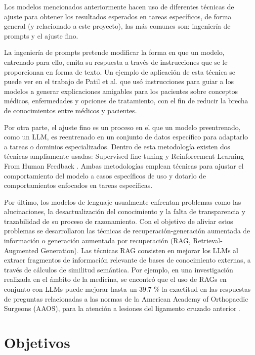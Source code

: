 Los modelos mencionados anteriormente hacen uso de diferentes técnicas de ajuste
para obtener los resultados esperados en tareas específicos, de forma general
(y relacionado a este proyecto), las más comunes son: ingeniería de
prompts y el ajuste fino.

La ingeniería de prompts pretende modificar la forma en que un modelo, entrenado
para ello, emita su respuesta a través de instrucciones que se le proporcionan
en forma de texto. Un ejemplo de aplicación de esta técnica se puede ver en el
trabajo de Patil et al. \cite{patil_prompt_2024} que usó instrucciones para
guiar a los modelos a generar explicaciones amigables para los pacientes sobre
conceptos médicos, enfermedades y opciones de tratamiento, con el fin de
reducir la brecha de conocimientos entre médicos y pacientes.

Por otra parte, el ajuste fino es un proceso en el que un modelo preentrenado,
como un LLM, es reentrenado en un conjunto de datos específico para adaptarlo a
tareas o dominios especializados. Dentro de esta metodología existen dos técnicas
ampliamente usadas: Supervised fine-tuning y Reinforcement Learning From Human
Feedback \cite{anisuzzaman_fine-tuning_2025}. Ambas metodologías emplean técnicas
para ajustar el comportamiento del modelo a casos específicos de uso y dotarlo de
comportamientos enfocados en tareas específicas.

Por último, los modelos de lenguaje usualmente enfrentan problemas como las
alucinaciones, la desactualización del conocimiento y la falta de transparencia y
trazabilidad de su proceso de razonamiento. Con el objetivo de aliviar estos
problemas se desarrollaron las técnicas de recuperación-generación aumentada de
información o generación aumentada por recuperación (RAG, Retrieval-Augmented
Generation). Las técnicas RAG consisten en mejorar los LLMs al extraer
fragmentos de información relevante de bases de conocimiento externas, a través
de cálculos de similitud semántica.
Por ejemplo, en una investigación realizada en el ámbito de la medicina, se
encontró que el uso de RAGs en conjunto con LLMs puede mejorar hasta un 39.7 \%
la exactitud en las respuestas de preguntas relacionadas a las normas de la
American Academy of Orthopaedic Surgeons (AAOS), para la atención a lesiones
del ligamento cruzado anterior \cite{woo_custom_2025}.

\section{Objetivos}

